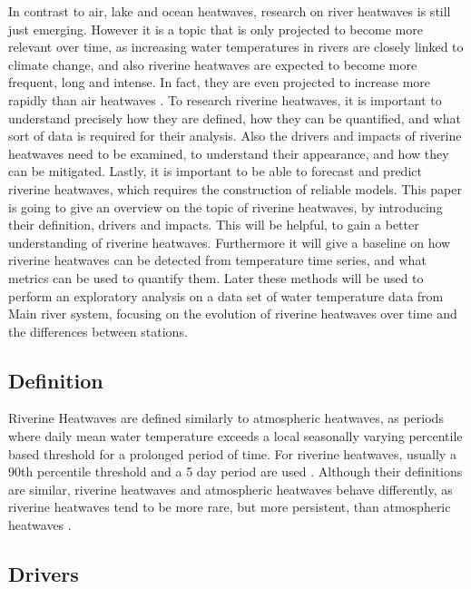 \documentclass[
]{krantz}
\begin{document}
In contrast to air, lake and ocean heatwaves, research on river heatwaves is still just emerging. However it is a topic
that is only projected to become more relevant over time, as increasing water temperatures in rivers are closely linked
to climate change, and also riverine heatwaves are expected to become more frequent, long and intense. In fact, they are
even projected to increase more rapidly than air heatwaves \citep{sadayappan2025}. To research riverine heatwaves, it is
important to understand precisely how they are defined, how they can be quantified, and what sort of data is required
for their analysis. Also the drivers and impacts of riverine heatwaves need to be examined, to understand their
appearance, and how they can be mitigated. Lastly, it is important to be able to forecast and predict riverine
heatwaves, which requires the construction of reliable models.
This paper is going to give an overview on the topic of riverine heatwaves, by introducing their definition, drivers and
impacts. This will be helpful, to gain a better understanding of riverine heatwaves. Furthermore it will give a baseline on how riverine heatwaves can be detected from temperature time series, and what metrics can be used to quantify them. Later
these methods will be used to perform an exploratory analysis on a data set of water temperature data from Main river
system, focusing on the evolution of riverine heatwaves over time and the differences between stations.

\subsection{Definition}\label{definition}

Riverine Heatwaves are defined similarly to atmospheric heatwaves, as periods where daily mean water temperature
exceeds a local seasonally varying percentile based threshold for a prolonged period of time. For riverine heatwaves,
usually a 90th percentile threshold and a 5 day period are used \citep{vanhamel2025}.
Although their definitions are similar, riverine heatwaves and atmospheric heatwaves behave differently, as riverine
heatwaves tend to be more rare, but more persistent, than atmospheric heatwaves \citep{sadayappan2025}.

\subsection{Drivers}\label{drivers}
\end{document}
